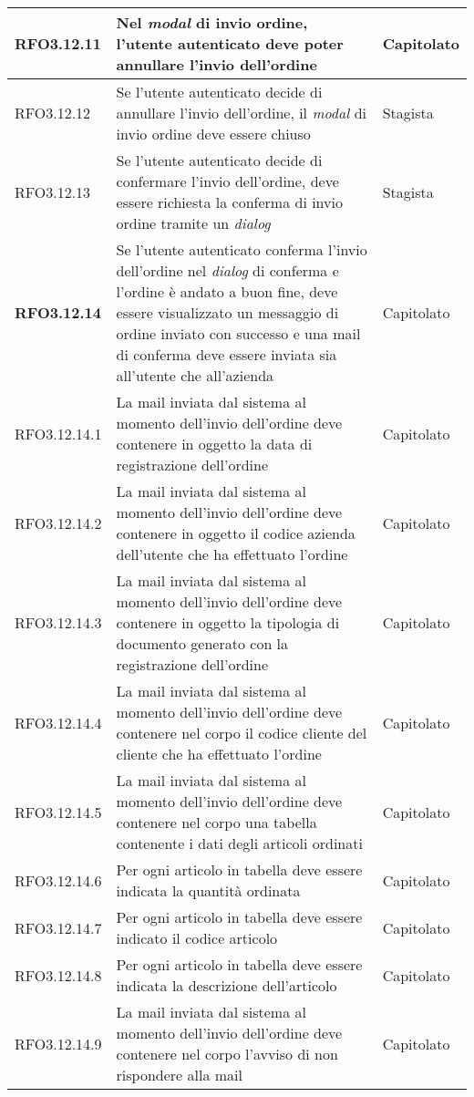 {\begin{center}
\begin{longtable}{ | >{\centering\arraybackslash}p{2.5cm} | >{\arraybackslash}p{7cm} | >{\centering\arraybackslash}p{2cm} | }
RFO3.12.11 & Nel \textit{modal} di invio ordine, l'utente autenticato deve poter annullare l'invio dell'ordine & Capitolato \\ \hline
RFO3.12.12 & Se l'utente autenticato decide di annullare l'invio dell'ordine, il \textit{modal} di invio ordine deve essere chiuso & Stagista \\ \hline
RFO3.12.13 & Se l'utente autenticato decide di confermare l'invio dell'ordine, deve essere richiesta la conferma di invio ordine tramite un \textit{dialog} & Stagista \\ \hline
\textbf{RFO3.12.14} & Se l'utente autenticato conferma l'invio dell'ordine nel \textit{dialog} di conferma e l'ordine è andato a buon fine, deve essere visualizzato un messaggio di ordine inviato con successo e una mail di conferma deve essere inviata sia all'utente che all'azienda & Capitolato \\ \hline
RFO3.12.14.1 & La mail inviata dal sistema al momento dell'invio dell'ordine deve contenere in oggetto la data di registrazione dell'ordine & Capitolato \\ \hline
RFO3.12.14.2 & La mail inviata dal sistema al momento dell'invio dell'ordine deve contenere in oggetto il codice azienda dell'utente che ha effettuato l'ordine & Capitolato \\ \hline
RFO3.12.14.3 & La mail inviata dal sistema al momento dell'invio dell'ordine deve contenere in oggetto la tipologia di documento generato con la registrazione dell'ordine & Capitolato \\ \hline
RFO3.12.14.4 & La mail inviata dal sistema al momento dell'invio dell'ordine deve contenere nel corpo il codice cliente del cliente che ha effettuato l'ordine & Capitolato \\ \hline
RFO3.12.14.5 & La mail inviata dal sistema al momento dell'invio dell'ordine deve contenere nel corpo una tabella contenente i dati degli articoli ordinati & Capitolato \\ \hline
RFO3.12.14.6 & Per ogni articolo in tabella deve essere indicata la quantità ordinata & Capitolato \\ \hline
RFO3.12.14.7 & Per ogni articolo in tabella deve essere indicato il codice articolo & Capitolato \\ \hline
RFO3.12.14.8 & Per ogni articolo in tabella deve essere indicata la descrizione dell'articolo & Capitolato \\ \hline
RFO3.12.14.9 & La mail inviata dal sistema al momento dell'invio dell'ordine deve contenere nel corpo l'avviso di non rispondere alla mail & Capitolato \\ \hline

\end{longtable}
\end{center}}
